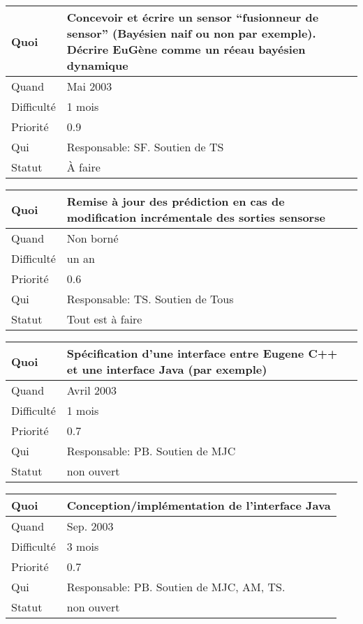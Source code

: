 \documentclass[a4paper,11pt]{article}
\begin{document}
\begin{longtable}{|l|p{7cm}|}\hline
  Quoi & Concevoir et \'ecrire un sensor ``fusionneur de sensor''
  (Bay\'esien naif ou non par exemple). D\'ecrire EuG\`ene comme un r\'eeau
  bay\'esien dynamique\\\hline
  Quand  &  Mai 2003\\\hline
  Difficult\'e & 1 mois \\\hline
  Priorit\'e &  0.9\\\hline
  Qui & Responsable: SF. Soutien de TS \\\hline
  Statut & \`A faire \\\hline
\end{longtable}
 
\begin{longtable}{|l|p{7cm}|}\hline
  Quoi & Remise \`a jour des pr\'ediction en cas de modification
  incr\'ementale des sorties sensorse\\\hline
  Quand  &  Non born\'e\\\hline
  Difficult\'e &  un an \\\hline
  Priorit\'e &  0.6\\\hline
  Qui & Responsable: TS. Soutien de Tous\\\hline
  Statut & Tout est \`a faire\\\hline
\end{longtable}



\begin{longtable}{|l|p{7cm}|}\hline
  Quoi & Sp\'ecification d'une interface entre Eugene C++ et une interface
Java (par exemple)\\\hline
  Quand  &  Avril 2003\\\hline
  Difficult\'e & 1 mois \\\hline
  Priorit\'e &  0.7\\\hline
  Qui & Responsable: PB. Soutien de MJC\\\hline
  Statut & non ouvert\\\hline
\end{longtable}

\begin{longtable}{|l|p{7cm}|}\hline
  Quoi & Conception/impl\'ementation de l'interface Java\\\hline
  Quand  &  Sep. 2003\\\hline
  Difficult\'e & 3 mois \\\hline
  Priorit\'e &  0.7\\\hline
  Qui & Responsable: PB. Soutien de MJC, AM, TS.\\\hline
  Statut & non ouvert \\\hline
\end{longtable}
\end{document}
